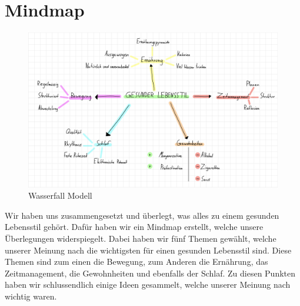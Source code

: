 \chapter{Mindmap}
\begin{figure}[!ht]
  \centering
  \includegraphics[width=.9\linewidth]{./images/mindmap.png}
  \caption[Ein von uns digital erstelltes Mindmap]{Wasserfall Modell}
  \label{fig:wasserfall}
\end{figure}
Wir haben uns zusammengesetzt und überlegt, was alles zu einem gesunden Lebensstil gehört.
\newline
Dafür haben wir ein Mindmap erstellt, welche unsere Überlegungen widerspiegelt. Dabei haben wir fünf Themen gewählt, welche unserer Meinung nach die wichtigsten für einen gesunden Lebensstil sind. Diese Themen sind zum einen die Bewegung, zum Anderen die Ernährung, das Zeitmanagement, die Gewohnheiten und ebenfalls der Schlaf.
\newline
Zu diesen Punkten haben wir schlussendlich einige Ideen gesammelt, welche unserer Meinung nach wichtig waren.
